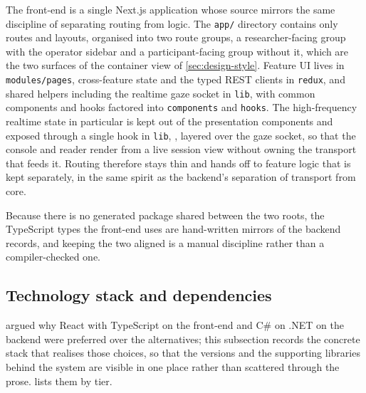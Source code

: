 The front-end is a single Next.js application whose source mirrors the same discipline of separating routing from logic.
The \texttt{app/} directory contains only routes and layouts, organised into two route groups, a researcher-facing group with the operator sidebar and a participant-facing group without it, which are the two surfaces of the container view of \cref{sec:design-style}.
Feature UI lives in \texttt{modules/pages}, cross-feature state and the typed REST clients in \texttt{redux}, and shared helpers including the realtime gaze socket in \texttt{lib}, with common components and hooks factored into \texttt{components} and \texttt{hooks}.
The high-frequency realtime state in particular is kept out of the presentation components and exposed through a single hook in \texttt{lib}, , layered over the gaze socket, so that the console and reader render from a live session view without owning the transport that feeds it.
Routing therefore stays thin and hands off to feature logic that is kept separately, in the same spirit as the backend's separation of transport from core.

Because there is no generated package shared between the two roots, the TypeScript types the front-end uses are hand-written mirrors of the backend records, and keeping the two aligned is a manual discipline rather than a compiler-checked one.
\subsection{Technology stack and dependencies}
\label{subsec:impl-stack}

 argued why React with TypeScript on the front-end and C\# on .NET on the backend were preferred over the alternatives; this subsection records the concrete stack that realises those choices, so that the versions and the supporting libraries behind the system are visible in one place rather than scattered through the prose.
 lists them by tier.


